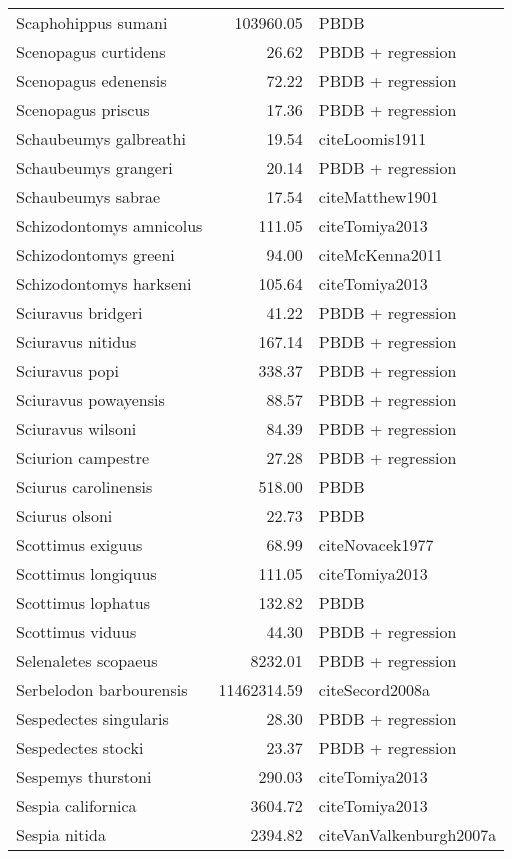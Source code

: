 \begin{table}[ht]
\begin{tabular}{lrl}
  Scaphohippus sumani & 103960.05 & PBDB \\ 
  Scenopagus curtidens & 26.62 & PBDB + regression \\ 
  Scenopagus edenensis & 72.22 & PBDB + regression \\ 
  Scenopagus priscus & 17.36 & PBDB + regression \\ 
  Schaubeumys galbreathi & 19.54 & cite{Loomis1911} \\ 
  Schaubeumys grangeri & 20.14 & PBDB + regression \\ 
  Schaubeumys sabrae & 17.54 & cite{Matthew1901} \\ 
  Schizodontomys amnicolus & 111.05 & cite{Tomiya2013} \\ 
  Schizodontomys greeni & 94.00 & cite{McKenna2011} \\ 
  Schizodontomys harkseni & 105.64 & cite{Tomiya2013} \\ 
  Sciuravus bridgeri & 41.22 & PBDB + regression \\ 
  Sciuravus nitidus & 167.14 & PBDB + regression \\ 
  Sciuravus popi & 338.37 & PBDB + regression \\ 
  Sciuravus powayensis & 88.57 & PBDB + regression \\ 
  Sciuravus wilsoni & 84.39 & PBDB + regression \\ 
  Sciurion campestre & 27.28 & PBDB + regression \\ 
  Sciurus carolinensis & 518.00 & PBDB \\ 
  Sciurus olsoni & 22.73 & PBDB \\ 
  Scottimus exiguus & 68.99 & cite{Novacek1977} \\ 
  Scottimus longiquus & 111.05 & cite{Tomiya2013} \\ 
  Scottimus lophatus & 132.82 & PBDB \\ 
  Scottimus viduus & 44.30 & PBDB + regression \\ 
  Selenaletes scopaeus & 8232.01 & PBDB + regression \\ 
  Serbelodon barbourensis & 11462314.59 & cite{Secord2008a} \\ 
  Sespedectes singularis & 28.30 & PBDB + regression \\ 
  Sespedectes stocki & 23.37 & PBDB + regression \\ 
  Sespemys thurstoni & 290.03 & cite{Tomiya2013} \\ 
  Sespia californica & 3604.72 & cite{Tomiya2013} \\ 
  Sespia nitida & 2394.82 & cite{VanValkenburgh2007a} \\ 

\end{tabular}
\end{table}
